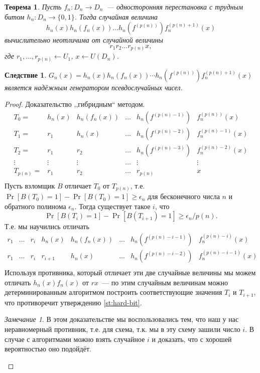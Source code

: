 \documentclass[12pt,a4paper]{article}
\newcommand{\bits}{\{0,1\}}
\theoremstyle{definition}
\theoremstyle{plain}
\newtheorem{theorem}{Теорема}[section]
\newtheorem{corollary}{Следствие}[section]
\theoremstyle{remark}
\newtheorem{remark}{Замечание}[section]
\begin{document}
\begin{theorem}
Пусть $f_n:D_n\to D_n$~--- односторонняя перестановка с трудным битом $h_n: D_n\to\bits$.
Тогда случайная величина 
$$h_n(x)h_n(f_n(x))\dotsc h_n(f^{(p(n))})f_n^{(p(n) + 1)}(x)$$
вычислительно неотличима от случайной величины 
$$r_1r_2\dotsc r_{p(n)}x,$$
где $r_1,\dotsc,r_{p(n)}\gets U_1$, $x\gets U(D_n)$.
\end{theorem}
\begin{corollary}
$G_n(x) = h_n(x)h_n(f_n(x))\dotsb h_n(f^{(p(n))})f_n^{(p(n) + 1)}(x)$ является надёжным генератором псевдослучайных чисел.
\end{corollary}
\begin{proof}
Доказательство ,,гибридным`` методом.
$$
\begin{array}{llllll}
T_0 = & h_n(x)&h_n(f_n(x))&\dotsc  &h_n(f^{(p(n)-1)})  &f_n^{(p(n))}(x)\\
T_1 = &r_1   &h_n(x)     &\dotsc  &h_n(f^{(p(n)-2)})&f_n^{(p(n)-1)}(x)\\
T_2 = &r_1   &r_2        &\dotsc  &h_n(f^{(p(n)-3)})&f_n^{(p(n)-2)}(x)\\
\vdots   &\vdots&\vdots     &\dotsc  &\vdots			 &\vdots\\
T_{p(n)}= &r_1   &r_2        &\dotsc  &r_{p(n)}		 &x\\
\end{array}
$$
Пусть взломщик $B$ отличает $T_0$ от $T_{p(n)}$, т.е. $\Pr[B(T_0) = 1] - \Pr[B(T_0) = 1]\ge\epsilon_n$
для бесконечного числа $n$ и обратного полинома $\epsilon_n$. Тогда существует такое $i$, что
$$\Pr[B(T_i) = 1] - \Pr[B(T_{i+1}) = 1]\ge\epsilon_n/p(n).$$ Т.е. мы научились отличать
$$
\begin{array}{llllllll}
r_1   &\dotsc & r_i & h_n(x)  & h_n(f_n(x)) &\dotsc& h_n(f^{(p(n)-i - 1)})    &f_n^{(p(n) - i)}(x)\\
r_1   &\dotsc & r_i & r_{i+1} & h_n(x)      &\dotsc& h_n(f^{(p(n)-i - 2)})&f_n^{(p(n) - i - 1)}(x)\\
\end{array}
$$
Используя противника, который отличает эти две случайные величины мы можем отличать $h_n(x)f_n(x)$ от $r x$~---
по этим случайным величинам можно детерминированным алгоритмом построить соответствующие значения $T_{i}$ и $T_{i+1}$, что противоречит утверждению \ref{st:hard-bit}.

\begin{remark}
В этом доказательстве мы воспользовались тем, что наш у нас неравномерный противник, т.е. для схема,
т.к. мы в эту схему зашили число $i$. В случае с алгоритмами можно взять случайное $i$ и доказать, 
что с хорошей вероятностью оно подойдёт.
\end{remark}
\end{proof}
\end{document}
